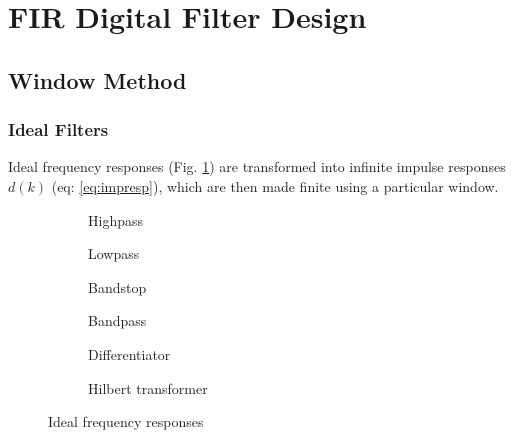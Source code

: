 \section{FIR Digital Filter Design}

\subsection{Window Method}
\subsubsection{Ideal Filters}
Ideal frequency responses (Fig. \ref{fig:freqresp}) are transformed into infinite impulse responses $d(k)$ (eq: \ref{eq:impresp}), which are then made finite using a particular window.

\begin{figure}[htp]
\begin{subfigure}{0.49\textwidth}
\centering
\newcommand{\coordinates}{coordinates {
(-3.14,1) (-1.569,1) (-1.571,0)
( 1.571,0) (1.569,1) ( 3.14,1)
};}

\caption{Highpass}
\end{subfigure}
\begin{subfigure}{0.49\textwidth}
\centering
\newcommand{\coordinates}{coordinates {(-3.14,0) (-1.569,0) (-1.571,1) (1.571,1) (1.569,0) (3.14,0)};}

\caption{Lowpass}
\end{subfigure}

\begin{subfigure}{0.49\textwidth}
\centering
\newcommand{\coordinates}{coordinates {
(-3.14,1) (-2.001,1) (-1.999,0) (-1.001,0) (-0.999,1)
(0.999,1) ( 1.001,0) ( 1.999,0) ( 2.001,1) ( 3.14,1)};}

\caption{Bandstop}
\end{subfigure}
\begin{subfigure}{0.49\textwidth}
\centering
\newcommand{\coordinates}{coordinates {
(-3.14,0) (-2.001,0) (-1.999,1) (-1.001,1) (-0.999,0)
(0.999,0) (1.001,1) (1.999,1) (2.001,0) ( 3.14,0)};}

\caption{Bandpass}
\end{subfigure}

\begin{subfigure}{0.49\textwidth}
\centering
\newcommand{\coordinates}{coordinates {(-3.14,-1) (3.14,1)};}

\caption{Differentiator}
\end{subfigure}
\begin{subfigure}{0.49\textwidth}
\centering
\newcommand{\coordinates}{coordinates {(-3.14,1) (-0.001,1) (0.001,-1) (3.14,-1) };}

\caption{Hilbert transformer}
\end{subfigure}

\caption{Ideal frequency responses}
\label{fig:freqresp}
\end{figure}


